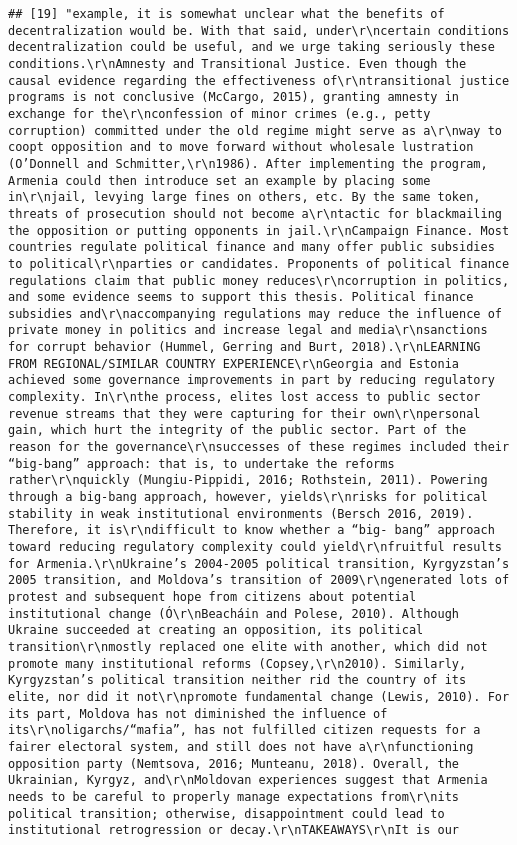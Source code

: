 \documentclass[
]{article}
\begin{document}
\begin{verbatim}
## [19] "example, it is somewhat unclear what the benefits of decentralization would be. With that said, under\r\ncertain conditions decentralization could be useful, and we urge taking seriously these conditions.\r\nAmnesty and Transitional Justice. Even though the causal evidence regarding the effectiveness of\r\ntransitional justice programs is not conclusive (McCargo, 2015), granting amnesty in exchange for the\r\nconfession of minor crimes (e.g., petty corruption) committed under the old regime might serve as a\r\nway to coopt opposition and to move forward without wholesale lustration (O’Donnell and Schmitter,\r\n1986). After implementing the program, Armenia could then introduce set an example by placing some in\r\njail, levying large fines on others, etc. By the same token, threats of prosecution should not become a\r\ntactic for blackmailing the opposition or putting opponents in jail.\r\nCampaign Finance. Most countries regulate political finance and many offer public subsidies to political\r\nparties or candidates. Proponents of political finance regulations claim that public money reduces\r\ncorruption in politics, and some evidence seems to support this thesis. Political finance subsidies and\r\naccompanying regulations may reduce the influence of private money in politics and increase legal and media\r\nsanctions for corrupt behavior (Hummel, Gerring and Burt, 2018).\r\nLEARNING FROM REGIONAL/SIMILAR COUNTRY EXPERIENCE\r\nGeorgia and Estonia achieved some governance improvements in part by reducing regulatory complexity. In\r\nthe process, elites lost access to public sector revenue streams that they were capturing for their own\r\npersonal gain, which hurt the integrity of the public sector. Part of the reason for the governance\r\nsuccesses of these regimes included their “big-bang” approach: that is, to undertake the reforms rather\r\nquickly (Mungiu-Pippidi, 2016; Rothstein, 2011). Powering through a big-bang approach, however, yields\r\nrisks for political stability in weak institutional environments (Bersch 2016, 2019). Therefore, it is\r\ndifficult to know whether a “big- bang” approach toward reducing regulatory complexity could yield\r\nfruitful results for Armenia.\r\nUkraine’s 2004-2005 political transition, Kyrgyzstan’s 2005 transition, and Moldova’s transition of 2009\r\ngenerated lots of protest and subsequent hope from citizens about potential institutional change (Ó\r\nBeacháin and Polese, 2010). Although Ukraine succeeded at creating an opposition, its political transition\r\nmostly replaced one elite with another, which did not promote many institutional reforms (Copsey,\r\n2010). Similarly, Kyrgyzstan’s political transition neither rid the country of its elite, nor did it not\r\npromote fundamental change (Lewis, 2010). For its part, Moldova has not diminished the influence of its\r\noligarchs/“mafia”, has not fulfilled citizen requests for a fairer electoral system, and still does not have a\r\nfunctioning opposition party (Nemtsova, 2016; Munteanu, 2018). Overall, the Ukrainian, Kyrgyz, and\r\nMoldovan experiences suggest that Armenia needs to be careful to properly manage expectations from\r\nits political transition; otherwise, disappointment could lead to institutional retrogression or decay.\r\nTAKEAWAYS\r\nIt is our 
\end{verbatim}
\end{document}
